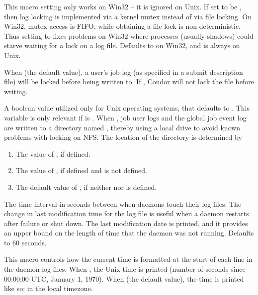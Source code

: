 \begin{description}
\label{param:FileLockViaMutex} 
\item[\Macro{FILE\_LOCK\_VIA\_MUTEX}]
  This macro setting only works on Win32 -- it is ignored on Unix.  If set
  to be , then log locking is implemented via a kernel mutex
  instead of via file locking.  On Win32, mutex access is FIFO, while
  obtaining a file lock is non-deterministic.  Thus setting to 
  fixes problems on Win32 where processes (usually shadows) could starve
  waiting for a lock on a log file.  Defaults to  on Win32, and is
  always  on Unix.

\label{param:EnableUserlogLocking}
\item[\Macro{ENABLE\_USERLOG\_LOCKING}]
  When  (the default value),
  a user's job log (as specified in a submit description file)
  will be locked before being written to.
  If , Condor will not lock the file before writing.

\label{param:NewLocking}
\item[\Macro{CREATE\_LOCKS\_ON\_LOCAL\_DISK}]
  A boolean value utilized only for Unix operating systems, 
  that defaults to . 
  This variable is only relevant if 
  is .
  When , job user logs and the global job event log are
  written to a directory named ,
  thereby using a local drive to avoid known problems with locking on NFS.
  The location of the  directory is determined by
  \begin{enumerate}
  \item The value of , if defined.
  \item The value of , if defined and 
  is not defined.
  \item The default value of , if neither 
  nor  is defined.
  \end{enumerate}

\label{param:TouchLogInterval}
\item[\Macro{TOUCH\_LOG\_INTERVAL}]
  The time interval in seconds between when daemons touch
  their log files.  The change in last modification time for the
  log file is useful when a daemon restarts after failure or shut down.
  The last modification date is printed, and it provides an upper bound
  on the length of time that the daemon was not running.
  Defaults to 60 seconds.

\label{param:LogsUseTimestamp}
\item[\Macro{LOGS\_USE\_TIMESTAMP}]
  This macro controls how the current time is formatted at the start of
  each line in the daemon log files. When , the Unix time is
  printed (number of seconds since 00:00:00 UTC, January 1, 1970).
  When  (the default value), the time is printed like so:
   in the local timezone.


\end{description}
